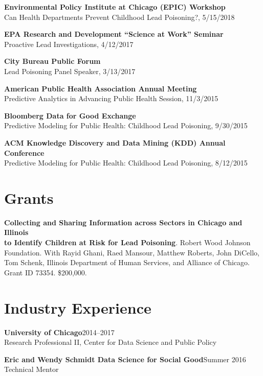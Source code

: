 \documentclass[margin,line]{resume}
\begin{document}
\begin{resume}
	{\bf Environmental Policy Institute at Chicago (EPIC) Workshop} \\
        Can Health Departments Prevent Childhood Lead Poisoning?, 5/15/2018

	{\bf EPA Research and Development ``Science at Work'' Seminar} \\
        Proactive Lead Investigations, 4/12/2017

	{\bf City Bureau Public Forum} \\
        Lead Poisoning Panel Speaker, 3/13/2017 

	{\bf American Public Health Association Annual Meeting} \\
    Predictive Analytics in Advancing Public Health Session, 11/3/2015 

	{\bf Bloomberg Data for Good Exchange} \\
        Predictive Modeling for Public Health: Childhood Lead Poisoning, 9/30/2015 

    {\bf ACM Knowledge Discovery and Data Mining (KDD) Annual Conference} \\
        Predictive Modeling for Public Health: Childhood Lead Poisoning, 8/12/2015

	\section{\mysidestyle Grants}
        {\bf Collecting and Sharing Information across Sectors in Chicago and Illinois\\ to Identify Children at Risk for Lead Poisoning}. Robert Wood Johnson\\ Foundation. With Rayid Ghani, Raed Mansour, Matthew Roberts, John DiCello,\\ Tom Schenk,  Illinois Department of Human Services, and Alliance of Chicago.\\ Grant ID 73354. \$200,000. \\

        \section{\mysidestyle Industry Experience}
	{\bf University of Chicago}\hfill{2014--2017}\\
	Research Professional II, Center for Data Science and Public Policy

        {\bf Eric and Wendy Schmidt Data Science for Social Good}\hfill{Summer 2016}\\
	Technical Mentor


\end{resume}
\end{document}
